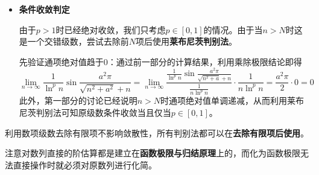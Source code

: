 \documentclass[a4paper,UTF8,fontset=windows,AutoFakeBold]{ctexart}
\newcommand*{\suminf}[1][n=1]{\sum_{#1}^\infty}
\newcommand*{\note}{\noindent *}
\theoremstyle{ex}
\begin{document}
\begin{framed}
{\begin{itemize}
        考虑级数$\suminf[n=2]\frac{1}{n\ln^pn}$，利用\textbf{$p$级数}敛散性结论可知其收敛当且仅当$p>1$，利用\textbf{归结原理}与\textbf{等价无穷小替换}得到
        $$\lim_{n\to\infty}\frac{\frac{1}{\ln^pn}\sin\frac{a^2\pi}{\sqrt{n^2+a}+n}}{\frac{1}{n\ln^pn}}=\lim_{x\to+\infty}x\sin\frac{a^2\pi}{\sqrt{x^2+a^2}+x}=\lim_{x\to+\infty}\frac{a^2\pi x}{\sqrt{x^2+a^2}+x}$$
        分子分母同除以$x$后由初等函数\textbf{连续性}与\textbf{复合函数极限}结论即可得到其为
        $$\lim_{x\to+\infty}\frac{a^2\pi}{\sqrt{1+\frac{a^2}{x^2}}+1}=\frac{a^2\pi}{2}$$
        从而根据\textbf{比较判别法}得原级数绝对收敛当且仅当$p>1$。

        \item \textbf{条件收敛判定}
        
        由于$p>1$时已经绝对收敛，我们只考虑$p\in[0,1]$的情况。由于当$n>N$时这是一个交错级数，尝试去除前$N$项后使用\textbf{莱布尼茨判别法}。

        先验证通项绝对值趋于0：通过前一部分的计算结果，利用乘除极限结论即得
        $$\lim_{n\to\infty}\frac{1}{\ln^pn}\sin\frac{a^2\pi}{\sqrt{n^2+a^2}+n}=\lim_{n\to\infty}\frac{\frac{1}{\ln^pn}\sin\frac{a^2\pi}{\sqrt{n^2+a}+n}}{\frac{1}{n\ln^pn}}\cdot\frac{1}{n\ln^pn}=\frac{a^2\pi}{2}\cdot0=0$$
        此外，第一部分的讨论已经说明$n>N$时通项绝对值单调递减，从而利用莱布尼茨判别法可知原级数条件收敛当且仅当$p\in[0,1]$。
    \end{itemize}
}
\end{framed}

\note 利用数项级数去除有限项不影响敛散性，所有判别法都可以在\textbf{去除有限项后使用}。

\note 注意对数列直接的阶估算都是建立在\textbf{函数极限与归结原理}上的，而化为函数极限无法直接操作时就必须对原数列进行化简。
\end{document}
